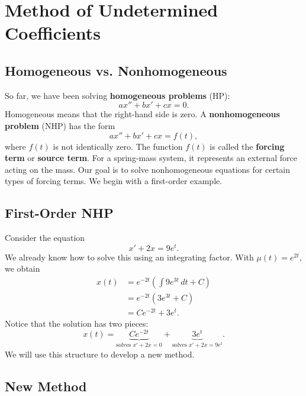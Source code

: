 \documentclass[10pt,letterpaper]{article}
\begin{document}


\section{Method of Undetermined Coefficients}

\subsection{Homogeneous vs. Nonhomogeneous}

So far, we have been solving \textbf{homogeneous problems} (HP):
\begin{equation}
ax''+bx'+cx=0. \tag{HP}
\end{equation}
Homogeneous means that the right-hand side is zero. A
\textbf{nonhomogeneous problem} (NHP) has the form
\begin{equation}
ax''+bx'+cx=f(t), \tag{NHP}
\end{equation}
where $f(t)$ is not identically zero. The function $f(t)$ is
called the \textbf{forcing term} or \textbf{source term}.
For a spring-mass system, it represents an external force
acting on the mass. Our goal is to solve nonhomogeneous equations
for certain types of forcing terms. We begin with a
first-order example.

\subsection{First-Order NHP}

Consider the equation
\[
x'+2x=9e^t.
\]
We already know how to solve this using an integrating factor.
With $\mu(t)=e^{2t}$, we obtain
\begin{align*}
x(t)
&=e^{-2t}\left(\int 9e^{3t}\,dt+C\right)\\
&=e^{-2t}\left(3e^{3t}+C\right)\\
&=Ce^{-2t}+3e^t.
\end{align*}
Notice that the solution has two pieces:
\[
x(t)=
\underbrace{Ce^{-2t}}_{\text{solves }x'+2x=0}
+
\underbrace{3e^t}_{\text{solves }x'+2x=9e^t}.
\]
We will use this structure to develop a new method.

\subsection{New Method}
\end{document}
